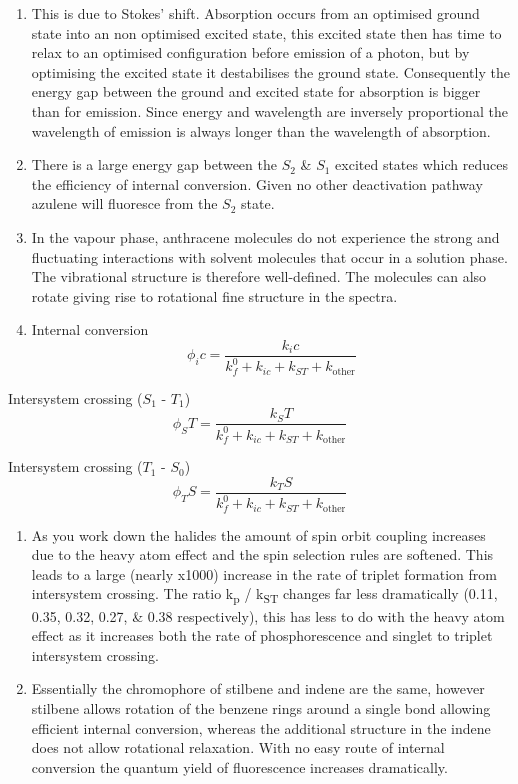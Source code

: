 \documentclass[
]{book}
\begin{document}
\begin{enumerate}
\def\labelenumi{\arabic{enumi}.}
\setcounter{enumi}{1}
\item
  This is due to Stokes' shift. Absorption occurs from an optimised ground state into an non optimised excited state, this excited state then has time to relax to an optimised configuration before emission of a photon, but by optimising the excited state it destabilises the ground state. Consequently the energy gap between the ground and excited state for absorption is bigger than for emission. Since energy and wavelength are inversely proportional the wavelength of emission is always longer than the wavelength of absorption.
\item
  There is a large energy gap between the \(S_2\) \& \(S_1\) excited states which reduces the efficiency of internal conversion. Given no other deactivation pathway azulene will fluoresce from the \(S_2\) state.
\item
  In the vapour phase, anthracene molecules do not experience the strong and fluctuating interactions with solvent molecules that occur in a solution phase. The vibrational structure is therefore well-defined. The molecules can also rotate giving rise to rotational fine structure in the spectra.
\item
  Internal conversion
  \begin{equation}
  \phi_ic = \frac{k_ic}{k_f^0+k_{ic}+ k_{ST}+k_{\textrm{other}}}
  \label{eq:QYIC}
  \end{equation}
\end{enumerate}

Intersystem crossing (\(S_1\) - \(T_1\))
\begin{equation}
\phi_ST = \frac{k_ST}{k_f^0+k_{ic}+ k_{ST}+k_{\textrm{other}}}
\label{eq:QYST}
\end{equation}

Intersystem crossing (\(T_1\) - \(S_0\))
\begin{equation}
\phi_TS = \frac{k_TS}{k_f^0+k_{ic}+ k_{ST}+k_{\textrm{other}}}
\label{eq:QYTS}
\end{equation}

\begin{enumerate}
\def\labelenumi{\arabic{enumi}.}
\setcounter{enumi}{5}
\item
  As you work down the halides the amount of spin orbit coupling increases due to the heavy atom effect and the spin selection rules are softened. This leads to a large (nearly x1000) increase in the rate of triplet formation from intersystem crossing. The ratio k\textsubscript{p} / k\textsubscript{ST} changes far less dramatically (0.11, 0.35, 0.32, 0.27, \& 0.38 respectively), this has less to do with the heavy atom effect as it increases both the rate of phosphorescence and singlet to triplet intersystem crossing.
\item
  Essentially the chromophore of stilbene and indene are the same, however stilbene allows rotation of the benzene rings around a single bond allowing efficient internal conversion, whereas the additional structure in the indene does not allow rotational relaxation. With no easy route of internal conversion the quantum yield of fluorescence increases dramatically.
\end{enumerate}
\end{document}
